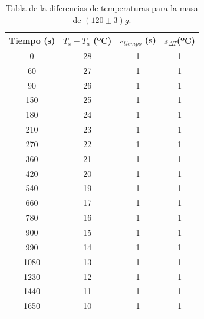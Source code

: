 \documentclass[a4paper]{article}
\begin{document}
\begin{table}[H]
  \centering
    \begin{tabular}{|c|c|c|c|} \hline
    Tiempo (s) & $T_x - T_a$ (ºC) & $s_{tiempo }$ (s) &  $s_{ \Delta T} $(ºC) \\ \hline
    0     & 28    & 1     & 1 \\ \hline
    60    & 27    & 1     & 1 \\ \hline
    90    & 26    & 1     & 1 \\ \hline
    150   & 25    & 1     & 1 \\ \hline
    180   & 24    & 1     & 1 \\ \hline
    210   & 23    & 1     & 1 \\ \hline
    270   & 22    & 1     & 1 \\ \hline
    360   & 21    & 1     & 1 \\ \hline
    420   & 20    & 1     & 1 \\ \hline
    540   & 19    & 1     & 1 \\ \hline
    660   & 17    & 1     & 1 \\ \hline
    780   & 16    & 1     & 1 \\ \hline
    900   & 15    & 1     & 1 \\ \hline
    990   & 14    & 1     & 1 \\ \hline
    1080  & 13    & 1     & 1 \\ \hline
    1230  & 12    & 1     & 1 \\ \hline
    1440  & 11    & 1     & 1 \\ \hline
    1650  & 10    & 1     & 1 \\ \hline
    \end{tabular}%
  \caption{Tabla de la diferencias de temperaturas para la masa de $(120\pm 3)g$.}
\end{table}%
\end{document}
